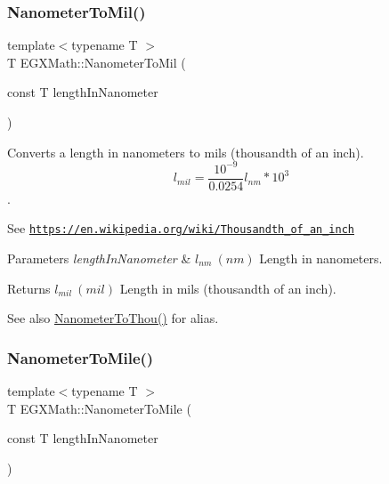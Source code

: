 \subsubsection{\texorpdfstring{Nanometer\+To\+Mil()}{NanometerToMil()}}
{\footnotesize\ttfamily template$<$typename T $>$ \\
T E\+G\+X\+Math\+::\+Nanometer\+To\+Mil (\begin{DoxyParamCaption}\item[{const T}]{length\+In\+Nanometer }\end{DoxyParamCaption})}



Converts a length in nanometers to mils (thousandth of an inch). \[ l_{mil}= \frac{10^{-9}}{0.0254} l_{nm} * 10^{3} \]. 

See \href{https://en.wikipedia.org/wiki/Thousandth_of_an_inch}{\tt https\+://en.\+wikipedia.\+org/wiki/\+Thousandth\+\_\+of\+\_\+an\+\_\+inch} 
\begin{DoxyParams}{Parameters}
{\em length\+In\+Nanometer} & $ l_{nm}\ (nm)$ Length in nanometers. \\
\hline
\end{DoxyParams}
\begin{DoxyReturn}{Returns}
$ l_{mil}\ (mil)$ Length in mils (thousandth of an inch). 
\end{DoxyReturn}
\begin{DoxySeeAlso}{See also}
\mbox{\hyperlink{group___e_g_x_math-_conversions-_length_conversions-_nanometer-_imperial_ga4c714a8d3ab333da358dafe181ebdcc4}{Nanometer\+To\+Thou()}} for alias. 
\end{DoxySeeAlso}
\mbox{\label{group___e_g_x_math-_conversions-_length_conversions-_nanometer-_imperial_gadbf1e269e14b8afcd128aa5534f28a5e}} 
\subsubsection{\texorpdfstring{Nanometer\+To\+Mile()}{NanometerToMile()}}
{\footnotesize\ttfamily template$<$typename T $>$ \\
T E\+G\+X\+Math\+::\+Nanometer\+To\+Mile (\begin{DoxyParamCaption}\item[{const T}]{length\+In\+Nanometer }\end{DoxyParamCaption})}



